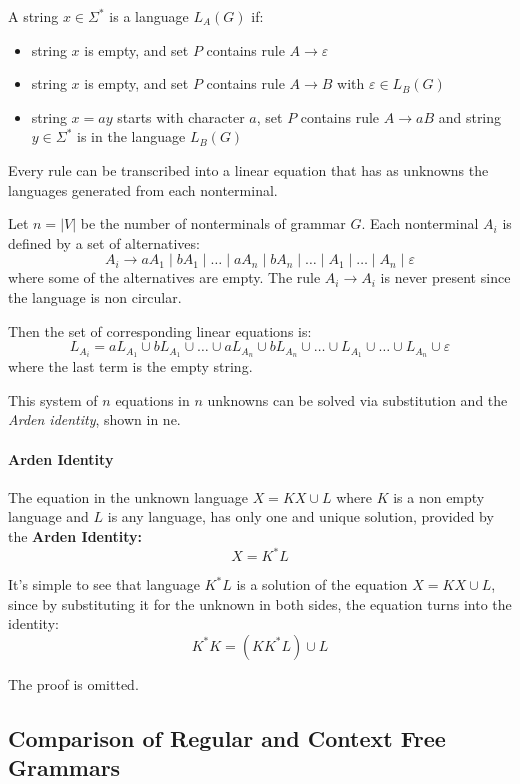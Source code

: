 \documentclass[english]{article}
\begin{document}
A string \(x \in \Sigma^\ast\) is a language \(L_A(G)\) if:

\begin{itemize}
  \item string \(x\) is empty, and set \(P\) contains rule \(A \rightarrow \varepsilon\)
  \item string \(x\) is empty, and set \(P\) contains rule \(A \rightarrow B\) with \(\varepsilon \in L_B(G)\)
  \item string \(x = ay\) starts with character \(a\), set \(P\) contains rule \(A \rightarrow aB\) and string \(y \in \Sigma^\ast\) is in the language \(L_B(G)\)
\end{itemize}

Every rule can be transcribed into a linear equation that has as unknowns the languages generated from each nonterminal.

Let \(n = |V|\) be the number of nonterminals of grammar \(G\).
Each nonterminal \(A_i\) is defined by a set of alternatives:
\[ A_i \rightarrow a A_1 \mid b A_1 \mid \ldots \mid a A_n \mid b A_n \mid \ldots \mid A_1 \mid \ldots \mid A_n \mid \varepsilon \]
where some of the alternatives are empty. The rule \(A_i \rightarrow A_i\) is never present since the language is non circular.

Then the set of corresponding linear equations is:
\[ L_{A_i} = a L_{A_1} \cup b L_{A_1} \cup \ldots \cup a L_{A_n} \cup b L_{A_n} \cup \ldots \cup L_{A_1} \cup \ldots \cup L_{A_n} \cup \varepsilon \]
where the last term is the empty string.

This system of \(n\) equations in \(n\) unknowns can be solved via substitution and the \textit{Arden identity}, shown in ne.

\paragraph{Arden Identity}

The equation in the unknown language \(X= K X \cup L\) where \(K\) is a non empty language and \(L\) is any language, has only one and unique solution, provided by the \textbf{Arden Identity:}
\[ X = K^\ast L \]

It's simple to see that language \(K^\ast L\) is a solution of the equation \(X = K X \cup L\), since by substituting it for the unknown in both sides, the equation turns into the identity:
\[ K^\ast K = (K K^\ast L) \cup L \]

\bigskip
The proof is omitted.

\subsection{Comparison of Regular and Context Free Grammars}
\end{document}
